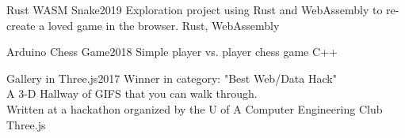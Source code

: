 
\begin{projects}
    \project
    {Rust WASM Snake}{2019}
    {}
    {Exploration project using Rust and WebAssembly to re-create a loved game in the browser.}
    {Rust, WebAssembly}

    \project
    {Arduino Chess Game}{2018}
    {}
    {Simple player vs. player chess game}
    {C++}

	\project
	{Gallery in Three.js}{2017}
	{}
	{
            Winner in category: "Best Web/Data Hack"\\
            A 3-D Hallway of GIFS that you can walk through.\\
            Written at a hackathon organized by the U of A Computer Engineering Club 
    }
    {Three.js}
				

\end{projects}
